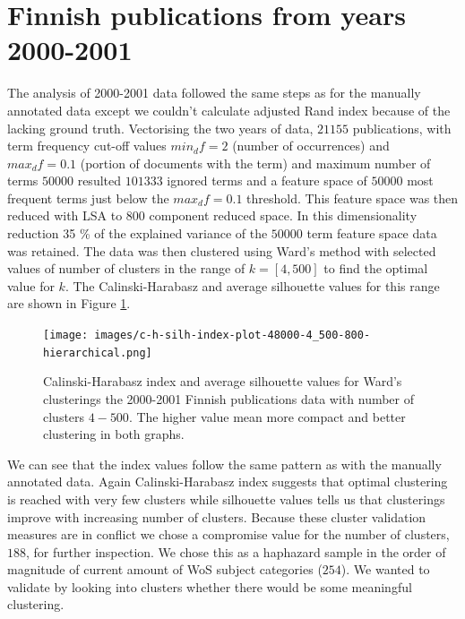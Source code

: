 \section{Finnish publications from years 2000-2001}
The analysis of 2000-2001 data followed the same steps as for 
the manually annotated data except we couldn't calculate adjusted
Rand index because of the lacking ground truth.
Vectorising the two years of data, $21155$ publications, with term 
frequency cut-off values $min_df=2$
(number of occurrences) and $max_df=0.1$ (portion of documents with
the term) and maximum number of terms $50000$ resulted $101333$ 
ignored terms and a feature space of $50000$ most frequent terms 
just below the $max_df=0.1$ threshold. 
This feature space was then reduced with LSA to $800$ component 
reduced space. In this dimensionality reduction 35 \% of the 
explained variance of the $50000$ term feature space data was retained.
The data was then clustered using Ward's method with selected 
values of number of clusters in the range of $k=[4,500]$ to find 
the optimal value for $k$.
The Calinski-Harabasz and average silhouette values for this range
are shown in Figure \ref{fig:ch-silh-2000-h}.
\begin{figure}[htp]
  \begin{center}    
\texttt{[image: images/c-h-silh-index-plot-48000-4\_500-800-hierarchical.png]}
    \caption{Calinski-Harabasz index and average silhouette values 
    for Ward's clusterings the 2000-2001 Finnish publications data
    with number of clusters $4-500$. The higher value mean more 
    compact and better clustering in both graphs.}
    \label{fig:ch-silh-2000-h}
  \end{center}
\end{figure}
We can see that the index values follow the same pattern as with 
the manually annotated data. Again Calinski-Harabasz index 
suggests that optimal clustering is reached with very few clusters
while silhouette values tells us that clusterings improve with 
increasing number of clusters. Because these cluster validation 
measures are in conflict we chose a compromise value for the 
number of clusters, $188$, for further inspection. We chose this 
as a haphazard sample in the order of magnitude of current amount 
of WoS subject categories ($254$).
We wanted to validate by looking into clusters whether there would
be some meaningful clustering.

